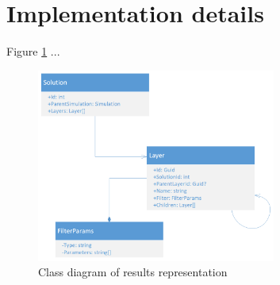 \section{Implementation details}
\label{sec:implementation-details}




Figure \ref{fig:results-class-diagram} ...


\begin{figure}[H]
    \centering
    \includegraphics[width=0.7\textwidth]{figures/chapter-data-management/results-class-diagram}
    \decoRule
    \caption{Class diagram of results representation}
    \label{fig:results-class-diagram}
\end{figure}